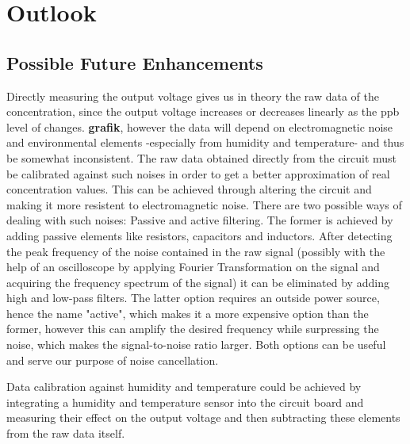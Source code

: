 \chapter{Outlook}
\label{sec:outlook}

\section{Possible Future Enhancements}
Directly measuring the output voltage gives us in theory the raw data of the  concentration, since the output voltage increases or decreases linearly as the ppb level of  changes. \textbf{grafik}, however the data will depend on electromagnetic noise and environmental elements -especially from humidity and temperature- and thus be somewhat inconsistent. The raw data obtained directly from the circuit must be calibrated against such noises in order to get a better approximation of real concentration values. This can be achieved through altering the circuit and making it more resistent to electromagnetic noise. There are two possible ways of dealing with such noises: Passive and active filtering. The former is achieved by adding passive elements like resistors, capacitors and inductors. After detecting the peak frequency of the noise contained in the raw signal (possibly with the help of an oscilloscope by applying Fourier Transformation on the signal and acquiring the frequency spectrum of the signal) it can be eliminated by adding high and low-pass filters. The latter option requires an outside power source, hence the name "active", which makes it a more expensive option than the former, however this can amplify the desired frequency while surpressing the noise, which makes the signal-to-noise ratio larger. Both options can be useful and serve our purpose of noise cancellation.\par 
Data calibration against humidity and temperature could be achieved by integrating a humidity and temperature sensor into the circuit board and measuring their effect on the output voltage and then subtracting these elements from the raw data itself.

